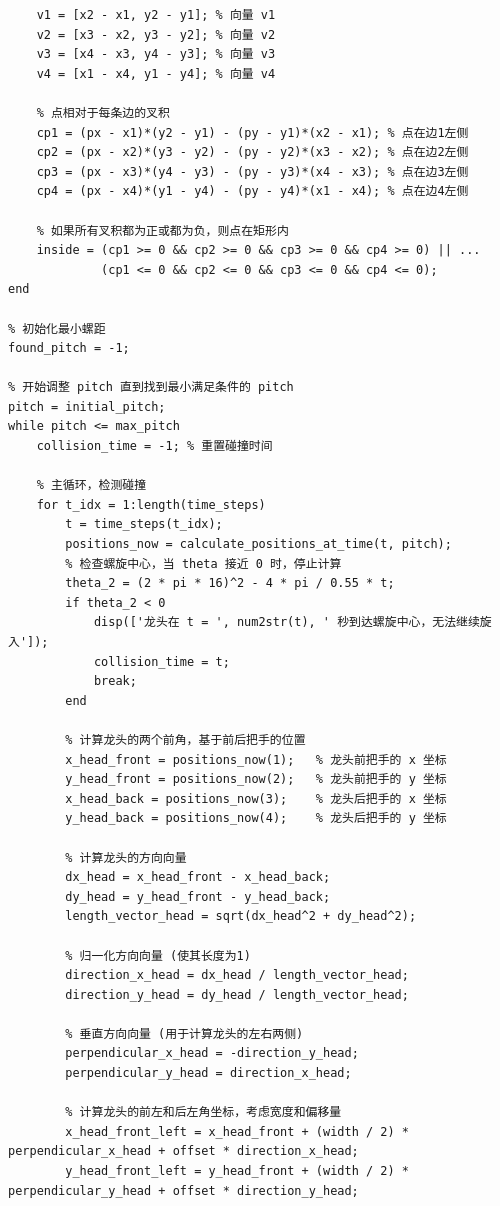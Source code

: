 \documentclass{cumcmthesis1}
\begin{document}
\begin{lstlisting}[caption={求解问题3的代码，将求解过程和结果打印到控制台}, label={lst:fourth_code}]
    % 使用向量叉积判断点是否在矩形内
    v1 = [x2 - x1, y2 - y1]; % 向量 v1
    v2 = [x3 - x2, y3 - y2]; % 向量 v2
    v3 = [x4 - x3, y4 - y3]; % 向量 v3
    v4 = [x1 - x4, y1 - y4]; % 向量 v4
    
    % 点相对于每条边的叉积
    cp1 = (px - x1)*(y2 - y1) - (py - y1)*(x2 - x1); % 点在边1左侧
    cp2 = (px - x2)*(y3 - y2) - (py - y2)*(x3 - x2); % 点在边2左侧
    cp3 = (px - x3)*(y4 - y3) - (py - y3)*(x4 - x3); % 点在边3左侧
    cp4 = (px - x4)*(y1 - y4) - (py - y4)*(x1 - x4); % 点在边4左侧
    
    % 如果所有叉积都为正或都为负，则点在矩形内
    inside = (cp1 >= 0 && cp2 >= 0 && cp3 >= 0 && cp4 >= 0) || ...
             (cp1 <= 0 && cp2 <= 0 && cp3 <= 0 && cp4 <= 0);
end

% 初始化最小螺距
found_pitch = -1;

% 开始调整 pitch 直到找到最小满足条件的 pitch
pitch = initial_pitch;
while pitch <= max_pitch
    collision_time = -1; % 重置碰撞时间

    % 主循环，检测碰撞
    for t_idx = 1:length(time_steps)
        t = time_steps(t_idx);
        positions_now = calculate_positions_at_time(t, pitch);
        % 检查螺旋中心，当 theta 接近 0 时，停止计算
        theta_2 = (2 * pi * 16)^2 - 4 * pi / 0.55 * t;
        if theta_2 < 0
            disp(['龙头在 t = ', num2str(t), ' 秒到达螺旋中心，无法继续旋入']);
            collision_time = t;
            break;
        end

        % 计算龙头的两个前角，基于前后把手的位置
        x_head_front = positions_now(1);   % 龙头前把手的 x 坐标
        y_head_front = positions_now(2);   % 龙头前把手的 y 坐标
        x_head_back = positions_now(3);    % 龙头后把手的 x 坐标
        y_head_back = positions_now(4);    % 龙头后把手的 y 坐标

        % 计算龙头的方向向量
        dx_head = x_head_front - x_head_back;
        dy_head = y_head_front - y_head_back;
        length_vector_head = sqrt(dx_head^2 + dy_head^2);

        % 归一化方向向量 (使其长度为1)
        direction_x_head = dx_head / length_vector_head;
        direction_y_head = dy_head / length_vector_head;

        % 垂直方向向量 (用于计算龙头的左右两侧)
        perpendicular_x_head = -direction_y_head;
        perpendicular_y_head = direction_x_head;

        % 计算龙头的前左和后左角坐标，考虑宽度和偏移量
        x_head_front_left = x_head_front + (width / 2) * perpendicular_x_head + offset * direction_x_head;
        y_head_front_left = y_head_front + (width / 2) * perpendicular_y_head + offset * direction_y_head;
    

\end{lstlisting}
\end{document}
